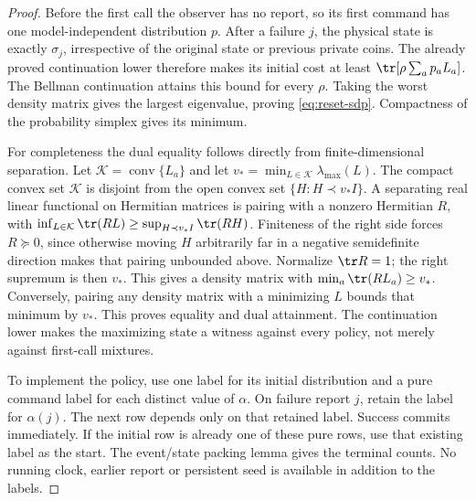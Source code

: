 \begin{proof}
Before the first call the observer has no report, so its first command has one model-independent distribution $p$. After a failure $j$, the physical state is exactly $\sigma_j$, irrespective of the original state or previous private coins. The already proved continuation lower therefore makes its initial cost at least
$\tr[\rho\sum_a p_aL_a]$. The Bellman continuation attains this bound for every $\rho$. Taking the worst density matrix gives the largest eigenvalue, proving \eqref{eq:reset-sdp}. Compactness of the probability simplex gives its minimum.

For completeness the dual equality follows directly from finite-dimensional separation. Let $\mathcal K=\operatorname{conv}\{L_a\}$ and let $v_* =\min_{L\in\mathcal K}\lambda_{\max}(L)$. The compact convex set $\mathcal K$ is disjoint from the open convex set $\{H:H\prec v_*I\}$. A separating real linear functional on Hermitian matrices is pairing with a nonzero Hermitian $R$, with $\inf_{L\in\mathcal K}\tr(RL)\ge\sup_{H\prec v_*I}\tr(RH)$. Finiteness of the right side forces $R\succeq0$, since otherwise moving $H$ arbitrarily far in a negative semidefinite direction makes that pairing unbounded above. Normalize $\tr R=1$; the right supremum is then $v_*$. This gives a density matrix with $\min_a\tr(RL_a)\ge v_*$. Conversely, pairing any density matrix with a minimizing $L$ bounds that minimum by $v_*$. This proves equality and dual attainment. The continuation lower makes the maximizing state a witness against every policy, not merely against first-call mixtures.

To implement the policy, use one label for its initial distribution and a pure command label for each distinct value of $\alpha$. On failure report $j$, retain the label for $\alpha(j)$. The next row depends only on that retained label. Success commits immediately. If the initial row is already one of these pure rows, use that existing label as the start. The event/state packing lemma gives the terminal counts. No running clock, earlier report or persistent seed is available in addition to the labels.
\end{proof}

